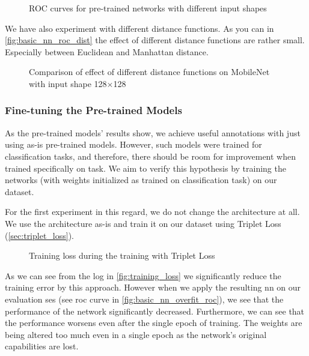 \begin{figure}
    \centering
    \def\svgwidth{\columnwidth}
    
    \caption{ROC curves for pre-trained networks with different input shapes}
    \label{fig:pretrained_nn_roc}
\end{figure}

We have also experiment with different distance functions. As you can in \autoref{fig:basic_nn_roc_dist} the effect of different distance functions are rather small. Especially between Euclidean and Manhattan distance.

\begin{figure}
    \centering
    \def\svgwidth{\columnwidth}
    
    \caption{Comparison of effect of different distance functions on MobileNet with input shape 128$\times$128}
    \label{fig:basic_nn_roc_dist}
\end{figure}

\subsubsection{Fine-tuning the Pre-trained Models}

As the pre-trained models' results show, we achieve useful annotations with just using as-is pre-trained models. However, such models were trained for classification tasks, and therefore, there should be room for improvement when trained specifically on \reid{} task. We aim to verify this hypothesis by training the networks (with weights initialized as trained on classification task) on our dataset.

For the first experiment in this regard, we do not change the architecture at all. We use the architecture as-is and train it on our dataset using Triplet Loss (\autoref{sec:triplet_loss}).

\begin{figure}
    \centering
    \def\svgwidth{\columnwidth}
    \large
    \scalebox{0.8}{}
    \caption{Training loss during the training with Triplet Loss}
    \label{fig:training_loss}
\end{figure}

As we can see from the log in \autoref{fig:training_loss} we significantly reduce the training error by this approach. However when we apply the resulting \gls{nn} on our evaluation \gls{ses} (see \gls{roc} curve in \autoref{fig:basic_nn_overfit_roc}), we see that the performance of the network significantly decreased. Furthermore, we can see that the performance worsens even after the single epoch of training. The weights are being altered too much even in a single epoch as the network's original capabilities are lost.

